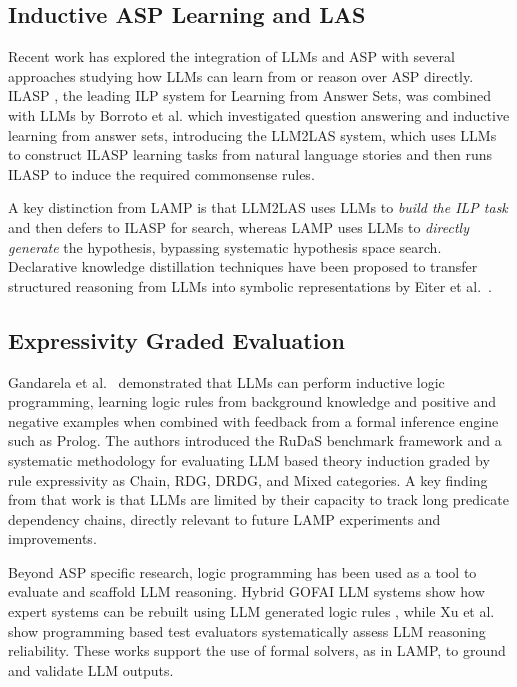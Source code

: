 \documentclass[11pt,a4paper]{article}
\begin{document}
\subsection{Inductive ASP Learning and LAS}

Recent work has explored the integration of LLMs and ASP with several approaches studying how LLMs can learn from or reason over ASP directly. ILASP \cite{law2020ilaspinductivelearninganswer}, the leading ILP system for Learning from Answer Sets, was combined with LLMs by Borroto et al. \cite{borroto2025questionansweringllmslearning} which investigated question answering and inductive learning from answer sets, introducing the LLM2LAS system, which uses LLMs to construct ILASP learning tasks from natural language stories and then runs ILASP to induce the required commonsense rules.

A key distinction from LAMP is that LLM2LAS uses LLMs to \emph{build the ILP task} and then defers to ILASP for search, whereas LAMP uses LLMs to \emph{directly generate} the hypothesis, bypassing systematic hypothesis space search. Declarative knowledge distillation techniques have been proposed to transfer structured reasoning from LLMs into symbolic representations by Eiter et al.~\cite{eiter2024declarativeknowledgedistillationlarge}.

\subsection{Expressivity Graded Evaluation}

Gandarela et al.~\cite{gandarela2025inductivelearninglogicaltheories} demonstrated that LLMs can perform inductive logic programming, learning logic rules from background knowledge and positive and negative examples when combined with feedback from a formal inference engine such as Prolog. The authors introduced the RuDaS benchmark framework and a systematic methodology for evaluating LLM based theory induction graded by rule expressivity as Chain, RDG, DRDG, and Mixed categories. A key finding from that work is that LLMs are limited by their capacity to track long predicate dependency chains, directly relevant to future LAMP experiments and improvements.

Beyond ASP specific research, logic programming has been used as a tool to evaluate and scaffold LLM reasoning. Hybrid GOFAI LLM systems show how expert systems can be rebuilt using LLM generated logic rules \cite{garridomerchán2026gofaimeetsgenerativeai}, while Xu et al.~\cite{xu2025socratessmartypantstestinglogic} show programming based test evaluators systematically assess LLM reasoning reliability. These works support the use of formal solvers, as in LAMP, to ground and validate LLM outputs.
\end{document}
